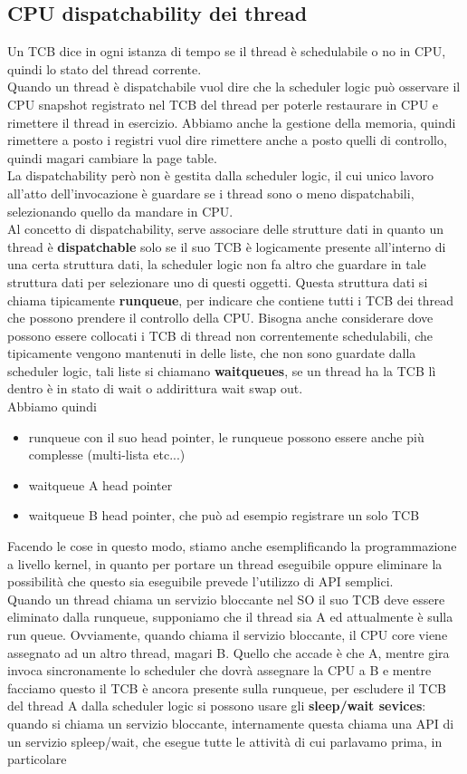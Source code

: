 \documentclass[12pt, oneside]{extbook}
\begin{document}
\subsection{CPU dispatchability dei thread}
Un TCB dice in ogni istanza di tempo se il thread è schedulabile o no in CPU, quindi lo stato del thread corrente.\\Quando un thread è dispatchabile vuol dire che la scheduler logic può osservare il CPU snapshot registrato nel TCB del thread per poterle restaurare in CPU e rimettere il thread in esercizio. Abbiamo anche la gestione della memoria, quindi rimettere a posto i registri vuol dire rimettere anche a posto quelli di controllo, quindi magari cambiare la page table.\\La dispatchability però non è gestita dalla scheduler logic, il cui unico lavoro all'atto dell'invocazione è guardare se i thread sono o meno dispatchabili, selezionando quello da mandare in CPU.\\Al concetto di dispatchability, serve associare delle strutture dati in quanto un thread è \textbf{dispatchable} solo se il suo TCB è logicamente presente all'interno di una certa struttura dati, la scheduler logic non fa altro che guardare in tale struttura dati per selezionare uno di questi oggetti. Questa struttura dati si chiama tipicamente \textbf{runqueue}, per indicare che contiene tutti i TCB dei thread che possono prendere il controllo della CPU. Bisogna anche considerare dove possono essere collocati i TCB di thread non correntemente schedulabili, che tipicamente vengono mantenuti in delle liste, che non sono guardate dalla scheduler logic, tali liste si chiamano \textbf{waitqueues}, se un thread ha la TCB lì dentro è in stato di wait o addirittura wait swap out.\\Abbiamo quindi
\begin{itemize}
\item runqueue con il suo head pointer, le runqueue possono essere anche più complesse (multi-lista etc...)
\item waitqueue A head pointer
\item waitqueue B head pointer, che può ad esempio registrare un solo TCB
\end{itemize}
Facendo le cose in questo modo, stiamo anche esemplificando la programmazione a livello kernel, in quanto per portare un thread eseguibile oppure eliminare la possibilità che questo sia eseguibile prevede l'utilizzo di API semplici.\\Quando un thread chiama un servizio bloccante nel SO il suo TCB deve essere eliminato dalla runqueue, supponiamo che il thread sia A ed attualmente è sulla run queue. Ovviamente, quando chiama il servizio bloccante, il CPU core viene assegnato ad un altro thread, magari B. Quello che accade è che A, mentre gira invoca sincronamente lo scheduler che dovrà assegnare la CPU a B e mentre facciamo questo il TCB è ancora presente sulla runqueue, per escludere il TCB del thread A dalla scheduler logic si possono usare gli \textbf{sleep/wait sevices}: quando si chiama un servizio bloccante, internamente questa chiama una API di un servizio spleep/wait, che esegue tutte le attività di cui parlavamo prima, in particolare 
\end{document}
